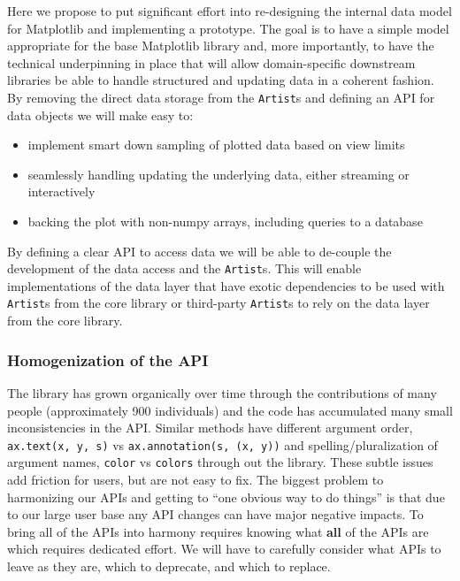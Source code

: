\documentclass[11pt]{article}  %
\begin{document}
Here we propose to put significant effort into re-designing the
internal data model for Matplotlib and implementing a prototype.  The
goal is to have a simple model appropriate for the base Matplotlib
library and, more importantly, to have the technical underpinning in
place that will allow domain-specific downstream libraries be able to
handle structured and updating data in a coherent fashion.  By
removing the direct data storage from the \texttt{Artist}s and
defining an API for data objects we will make easy to:
\begin{itemize}
  \item implement smart down sampling of plotted data based on view
    limits
  \item seamlessly handling updating the underlying data, either
    streaming or interactively
  \item backing the plot with non-numpy arrays, including queries to a
    database
\end{itemize}
By defining a clear API to access data we will be able to de-couple
the development of the data access and the \texttt{Artist}s.  This
will enable implementations of the data layer that have exotic
dependencies to be used with \texttt{Artist}s from the core library or
third-party \texttt{Artist}s to rely on the data layer from the core
library.

\subsubsection{Homogenization of the API}

The library has grown organically over time through the contributions
of many people (approximately 900 individuals) and the code has
accumulated many small inconsistencies in the API.  Similar methods
have different argument order, \texttt{ax.text(x, y, s)} vs
\texttt{ax.annotation(s, (x, y))} and spelling/pluralization of
argument names, \texttt{color} vs \texttt{colors} through out the
library.  These subtle issues add friction for users, but are not easy
to fix.  The biggest problem to harmonizing our APIs and getting to
``one obvious way to do things'' is that due to our large user base
any API changes can have major negative impacts.  To bring all of the
APIs into harmony requires knowing what \textbf{all} of the APIs are
which requires dedicated effort.  We will have to carefully consider
what APIs to leave as they are, which to deprecate, and which to
replace.
\end{document}
